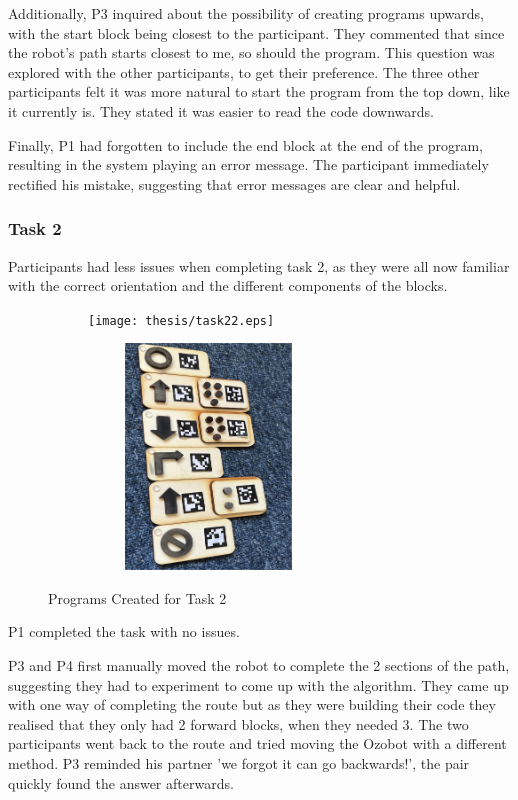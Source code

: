 \documentclass[oneside,%
                    author={Malak Hajji},
                    degree={BSc},
                    title={Designing An Accessible Ozobot Programming Platform for Students},
                  subtitle={With Mixed Visual Abilities}]{dissertation}
\begin{document}
Additionally, P3 inquired about the possibility of creating programs upwards, with the start block being closest to the participant. They commented that since the robot's path starts closest to me, so should the program. This question was explored with the other participants, to get their preference. The three other participants felt it was more natural to start the program from the top down, like it currently is. They stated it was easier to read the code downwards. 

Finally, P1 had forgotten to include the end block at the end of the program, resulting in the system playing an error message. The participant immediately rectified his mistake, suggesting that error messages are clear and helpful.

\subsubsection{Task 2}
Participants had less issues when completing task 2, as they were all now familiar with the correct orientation and the different components of the blocks. 
\FloatBarrier

\begin{figure}[h]
\centering
\begin{subfigure}{.5\textwidth}
  \centering
  \texttt{[image: thesis/task22.eps]}
  \label{fig-condition}
\end{subfigure}%
\begin{subfigure}{.5\textwidth}
  \centering
  \includegraphics[width=0.7\textwidth,height=6cm]{thesis/totherask22.eps}
 
  \label{fig-condition2}
\end{subfigure}
\caption{Programs Created for Task 2}
\label{fig-task2}
\end{figure}
\FloatBarrier
P1 completed the task with no issues.

P3 and P4 first manually moved the robot to complete the 2 sections of the path, suggesting they had to experiment to come up with the algorithm. They came up with one way of completing the route but as they were building their code they realised that they only had 2 forward blocks, when they needed 3. The two participants went back to the route and tried moving the Ozobot with a different method. P3 reminded his partner 'we forgot it can go backwards!', the pair quickly found the answer afterwards.
\end{document}
